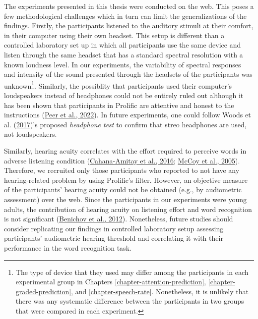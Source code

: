 \documentclass[a4paper, nobind]{templates/ociamthesis}
\begin{document}
The experiments presented in this thesis were conducted on the web.
This poses a few methodological challenges which in turn can limit the generalizations of the findings.
Firstly, the participants listened to the auditory stimuli at their comfort, in their computer using their own headset.
This setup is different than a controlled laboratory set up in which all participants use the same device and listen through the same headset that has a standard spectral resolution with a known loudness level.
In our experiments, the variability of spectral responses and intensity of the sound presented through the headsets of the participants was unknown\footnote{The type of device that they used may differ among the participants in each experimental group in Chapters \ref{chapter-attention-prediction}, \ref{chapter-graded-prediction}, and \ref{chapter-speech-rate}.
  Nonetheless, it is unlikely that there was any systematic difference between the participants in two groups that were compared in each experiment.}.
Similarly, the possiblity that participants used their computer's loudspeakers instead of headphones could not be entirely ruled out although it has been shown that participants in Prolific are attentive and honest to the instructions (\protect\hyperlink{ref-Eyal2022}{Peer et al., 2022}).
In future experiments, one could follow Woods et al. (\protect\hyperlink{ref-Woods2017}{2017})'s proposed \emph{headphone test} to confirm that streo headphones are used, not loudspeakers.

Similarly, hearing acuity correlates with the effort required to perceive words in adverse listening condition (\protect\hyperlink{ref-Cahana2016}{Cahana-Amitay et al., 2016}; \protect\hyperlink{ref-McCoy2005}{McCoy et al., 2005}).
Therefore, we recruited only those participants who reported to not have any hearing-related problem by using Prolific's filter.
However, an objective measure of the participants' hearing acuity could not be obtained (e.g., by audiometric assessment) over the web.
Since the participants in our experiments were young adults, the contribution of hearing acuity on listening effort and word recognition is not significant (\protect\hyperlink{ref-Benichov2012}{Benichov et al., 2012}).
Nonetheless, future studies should consider replicating our findings in controlled laboratory setup assessing participants' audiometric hearing threshold and correlating it with their performance in the word recognition task.
\end{document}
